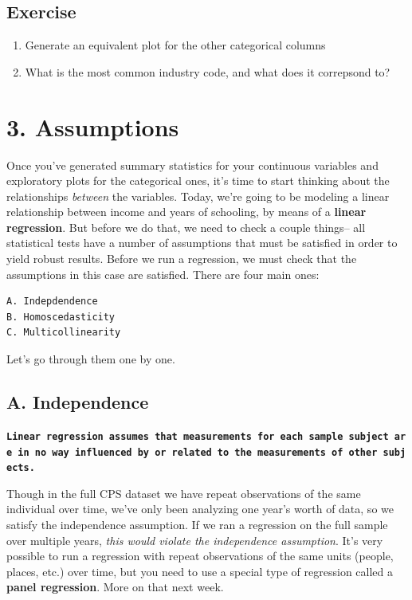 \documentclass[
  letterpaper,
  DIV=11,
  numbers=noendperiod]{scrreprt}
\providecommand{\tightlist}{%
  \setlength{\itemsep}{0pt}\setlength{\parskip}{0pt}}\usepackage{longtable,booktabs,array}
\begin{document}
\hypertarget{exercise-23}{%
\subsection{Exercise}\label{exercise-23}}

\begin{enumerate}
\def\labelenumi{\arabic{enumi}.}
\tightlist
\item
  Generate an equivalent plot for the other categorical columns
\item
  What is the most common industry code, and what does it correpsond to?
\end{enumerate}

\hypertarget{assumptions}{%
\section{3. Assumptions}\label{assumptions}}

Once you've generated summary statistics for your continuous variables
and exploratory plots for the categorical ones, it's time to start
thinking about the relationships \emph{between} the variables. Today,
we're going to be modeling a linear relationship between income and
years of schooling, by means of a \textbf{linear regression}. But before
we do that, we need to check a couple things-- all statistical tests
have a number of assumptions that must be satisfied in order to yield
robust results. Before we run a regression, we must check that the
assumptions in this case are satisfied. There are four main ones:

\begin{verbatim}
A. Indepdendence 
B. Homoscedasticity
C. Multicollinearity 
\end{verbatim}

Let's go through them one by one.

\hypertarget{a.-independence}{%
\subsection{A. Independence}\label{a.-independence}}

\textbf{\texttt{Linear\ regression\ assumes\ that\ measurements\ for\ each\ sample\ subject\ are\ in\ no\ way\ influenced\ by\ or\ related\ to\ the\ measurements\ of\ other\ subjects.}}

Though in the full CPS dataset we have repeat observations of the same
individual over time, we've only been analyzing one year's worth of
data, so we satisfy the independence assumption. If we ran a regression
on the full sample over multiple years, \emph{this would violate the
independence assumption}. It's very possible to run a regression with
repeat observations of the same units (people, places, etc.) over time,
but you need to use a special type of regression called a \textbf{panel
regression}. More on that next week.
\end{document}
